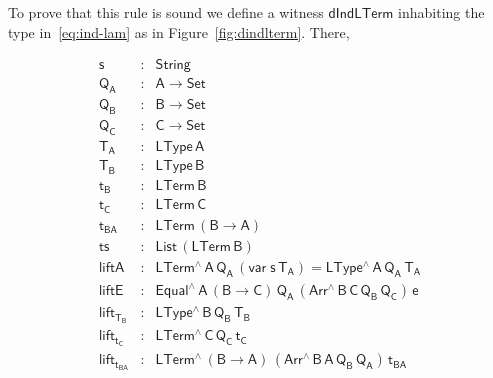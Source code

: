 \documentclass[sigplan,screen]{acmart}
\begin{document}
To prove that this rule is sound we define a witness
$\mathsf{dIndLTerm}$ inhabiting the type in~\eqref{eq:ind-lam} as in
Figure~\ref{fig:dindlterm}. There,


\[
\begin{array}{lll}
\mathsf{s} & : & \mathsf{String} \\
\mathsf{Q_A} & : & \mathsf{A \to Set} \\
\mathsf{Q_B} & : & \mathsf{B \to Set} \\
\mathsf{Q_C} & : & \mathsf{C \to Set} \\
\mathsf{T_A} & : & \mathsf{LType\, A} \\
\mathsf{T_B} & : & \mathsf{LType\, B} \\
\mathsf{t_B} & : & \mathsf{LTerm \, B} \\
\mathsf{t_C} & : & \mathsf{LTerm \, C} \\
\mathsf{t_{BA}} & : & \mathsf{LTerm \, (B \to A)} \\
\mathsf{ts} & : & \mathsf{List\, (LTerm\, B)}\\
\mathsf{liftA} & : & \mathsf{LTerm^{\wedge}\, A\, Q_A\, (var\;s\,T_A) = LType^{\wedge}\,A\,Q_A\,T_A} \\
\mathsf{liftE} & : & \mathsf{Equal^{\wedge}\, A\, (B \to C)\, Q_A\, (Arr^{\wedge} \, B\, C\, Q_B \, Q_C) \, e} \\
\mathsf{lift_{T_B}} & : & \mathsf{LType^{\wedge} \, B\, Q_B\, T_B} \\
\mathsf{lift_{t_C}} & : & \mathsf{LTerm^{\wedge} \, C\, Q_C\, t_C} \\
\mathsf{lift_{t_{BA}}} & : & \mathsf{LTerm^{\wedge} \, (B \to A)\, (Arr^{\wedge} \, B\, A\, Q_B \, Q_A)\, t_{BA}}
\end{array}\]
\end{document}
